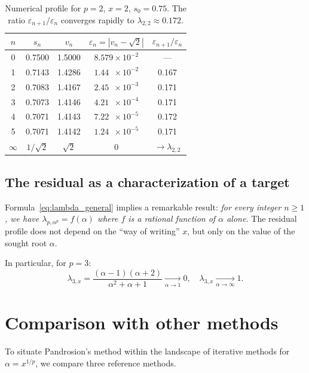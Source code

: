 \documentclass[11pt,a4paper]{article}
\theoremstyle{definition}
\newcommand{\eps}{\varepsilon}
\begin{document}
\begin{table}[h]
\centering
\begin{tabular}{ccccc}
\toprule
$n$ & $s_n$ & $v_n$ & $\eps_n = |v_n - \sqrt{2}|$ & $\eps_{n+1}/\eps_n$ \\
\midrule
0 & 0.7500 & 1.5000 & $8.579\times 10^{-2}$ & --- \\
1 & 0.7143 & 1.4286 & $1.44\phantom{0}\times 10^{-2}$ & 0.167 \\
2 & 0.7083 & 1.4167 & $2.45\phantom{0}\times 10^{-3}$ & 0.171 \\
3 & 0.7073 & 1.4146 & $4.21\phantom{0}\times 10^{-4}$ & 0.171 \\
4 & 0.7071 & 1.4143 & $7.22\phantom{0}\times 10^{-5}$ & 0.172 \\
5 & 0.7071 & 1.4142 & $1.24\phantom{0}\times 10^{-5}$ & 0.171 \\
$\infty$ & $1/\sqrt{2}$ & $\sqrt{2}$ & $0$ & $\to \lambda_{2,2}$ \\
\bottomrule
\end{tabular}
\caption{Numerical profile for $p=2$, $x=2$, $s_0 = 0.75$. The ratio $\eps_{n+1}/\eps_n$ converges rapidly to $\lambda_{2,2} \approx 0.172$.}
\end{table}

\subsection{The residual as a characterization of a target}

Formula~\eqref{eq:lambda_general} implies a remarkable result: \textit{for every integer $n \geq 1$, we have $\lambda_{p, \alpha^p} = f(\alpha)$ where $f$ is a rational function of $\alpha$ alone.} The residual profile does not depend on the ``way of writing'' $x$, but only on the value of the sought root $\alpha$.

In particular, for $p = 3$:
\[
  \lambda_{3,x} = \frac{(\alpha-1)(\alpha+2)}{\alpha^2+\alpha+1} \xrightarrow[\alpha \to 1]{} 0, \quad
  \lambda_{3,x} \xrightarrow[\alpha \to \infty]{} 1.
\]

\section{Comparison with other methods}
\label{sec:comparaisons}

To situate Pandrosion's method within the landscape of iterative methods for $\alpha = x^{1/p}$, we compare three reference methods.
\end{document}
